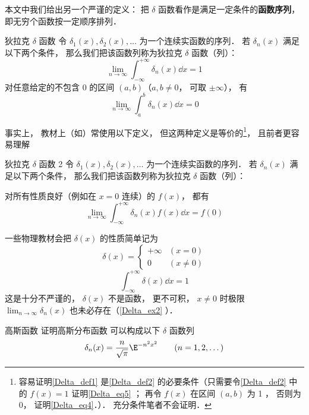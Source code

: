 本文中我们给出另一个严谨的定义： 把 $\delta$ 函数看作是满足一定条件的\textbf{函数序列}， 即无穷个函数按一定顺序排列．
\begin{definition}{狄拉克 $\delta$ 函数}\label{Delta_def1}
令 $\delta_1(x), \delta_2(x), \dots$ 为一个连续实函数的序列． 若 $\delta_n(x)$ 满足以下两个条件， 那么我们把该函数列称为狄拉克 $\delta$ 函数（列）：
\begin{equation}\label{Delta_eq5}
\lim_{n\to\infty}\int_{-\infty}^{+\infty} \delta_n(x) \dd{x} = 1
\end{equation}
对任意给定的不包含 0 的区间 $(a,b)$（$a,b \ne 0$， 可取 $\pm\infty$）， 有
\begin{equation}\label{Delta_eq4}
\lim_{n\to\infty} \int_{a}^{b} \delta_n(x) \dd{x} = 0
\end{equation}
\end{definition}
事实上， 教材上（如\cite{Arfken}）常使用以下定义， 但这两种定义是等价的\footnote{容易证明\autoref{Delta_def1} 是\autoref{Delta_def2} 的必要条件（只需要令\autoref{Delta_def2} 中的 $f(x) = 1$ 证明\autoref{Delta_eq5} ； 再令 $f(x)$ 在区间 $(a,b)$ 为 1 ， 否则为 0， 证明\autoref{Delta_eq4}．）． 充分条件笔者不会证明．}， 且前者更容易理解

\begin{definition}{狄拉克 $\delta$ 函数 2}\label{Delta_def2}
令 $\delta_1(x), \delta_2(x), \dots$ 为一个连续实函数的序列． 若 $\delta_n(x)$ 满足以下两个条件， 那么我们把该函数列称为狄拉克 $\delta$ 函数（列）：

对所有性质良好（例如在 $x = 0$ 连续）的 $f(x)$， 都有
\begin{equation}
\lim_{n\to\infty}\int_{-\infty}^{+\infty} \delta_n(x)f(x) \dd{x} = f(0)
\end{equation}
\end{definition}

一些物理教材会把 $\delta(x)$ 的性质简单记为
\begin{equation}\label{Delta_eq2}
\delta(x) =
\begin{cases}
+\infty & (x = 0)\\
0 & (x \ne 0)
\end{cases}
\end{equation}
\begin{equation}\label{Delta_eq3}
\int_{-\infty}^{+\infty} \delta(x) \dd{x} = 1
\end{equation}
这是十分不严谨的， $\delta(x)$ 不是函数， 更不可积， $x \ne 0$ 时极限 $\lim_{n\to \infty}\delta_n(x)$ 也未必存在（\autoref{Delta_ex2} ）．

\begin{exercise}{高斯函数}\label{Delta_exe2}
证明高斯分布函数 可以构成以下 $\delta$ 函数列
\begin{equation}
\delta_n(x) = \frac{n}{\sqrt{\pi}} \E^{-{n ^2}x^2} \qquad (n = 1, 2, \dots)
\end{equation}
\end{exercise}

